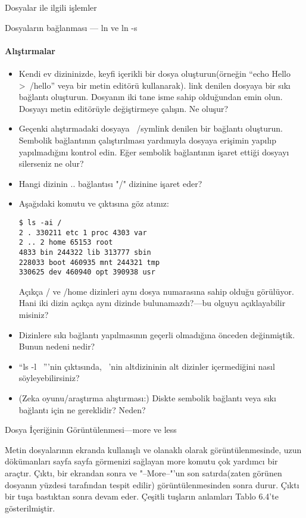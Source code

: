 \documentclass[10pt,a5paper]{book}
\begin{document}
\begin{section}{Dosyalar ile ilgili işlemler}
\begin{subsection}{Dosyaların bağlanması — ln ve ln -s}
\paragraph{Alıştırmalar}{
\begin{itemize}
 \item Kendi ev dizininizde, keyfi içerikli bir dosya oluşturun(örneğin “echo Hello >~/hello” veya bir metin editörü kullanarak). link denilen dosyaya bir sıkı bağlantı oluşturun. Dosyanın iki tane isme sahip olduğundan emin olun. Dosyayı metin editörüyle değiştirmeye çalışın. Ne oluşur?
 \item Geçenki alıştırmadaki dosyaya ~/symlink denilen bir bağlantı oluşturun. Sembolik bağlantının çalıştırılması yardımıyla dosyaya erişimin yapılıp yapılmadığını kontrol edin. Eğer sembolik bağlantının işaret ettiği dosyayı silerseniz ne olur?
 \item Hangi dizinin .. bağlantısı "/" dizinine işaret eder?
 \item Aşağıdaki komutu ve çıktısına göz atınız:\begin{verbatim}
$ ls -ai /
2 . 330211 etc 1 proc 4303 var
2 .. 2 home 65153 root
4833 bin 244322 lib 313777 sbin
228033 boot 460935 mnt 244321 tmp
330625 dev 460940 opt 390938 usr 
 \end{verbatim} Açıkça / ve /home dizinleri aynı dosya numarasına sahip olduğu görülüyor. Hani iki dizin açıkça aynı dizinde bulunamazdı?—bu olguyu açıklayabilir misiniz?
 \item Dizinlere sıkı bağlantı yapılmasının geçerli olmadığına önceden değinmiştik. Bunun nedeni nedir?
 \item “ls -l ~”'nin çıktısında, ~'nin altdizininin alt dizinler içermediğini nasıl söyleyebilirsiniz?
 \item (Zeka oyunu/araştırma alıştırması:) Diskte sembolik bağlantı veya sıkı bağlantı için ne gereklidir? Neden?
\end{itemize}}
\end{subsection}
\begin{subsection}{Dosya İçeriğinin Görüntülenmesi—more ve less}

Metin dosyalarının ekranda kullanışlı ve olanaklı olarak görüntülenmesinde, uzun dökümanları sayfa sayfa görmenizi sağlayan more komutu çok yardımcı bir araçtır. Çıktı, bir ekrandan sonra ve "--More--"'un son satırda(zaten görünen dosyanın yüzdesi tarafından tespit edilir) görüntülenmesinden sonra durur. Çıktı bir tuşa bastıktan sonra devam eder. Çeşitli tuşların anlamları Tablo 6.4'te gösterilmiştir.


\end{subsection}
\end{section}
\end{document}
